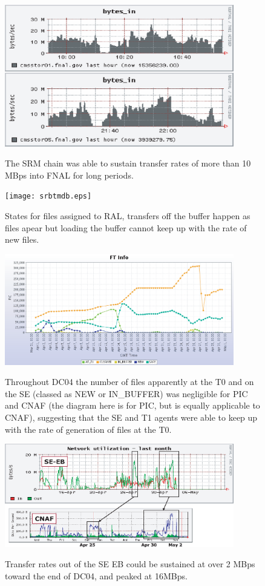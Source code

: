 \documentclass{cmspaper}
\begin{document}
\clearpage
\begin{figure}[tbp]
\centering
\includegraphics[angle=90,width=10cm]{FNAL-network.eps}
\label{fig:FNAL-network}
\caption{The SRM chain was able to sustain transfer rates of more than
10 MBps into FNAL for long periods.}
\end{figure}
\clearpage
\begin{figure}[tbp]
\centering
\texttt{[image: srbtmdb.eps]}
\label{fig:RAL-files}
\caption{States for files assigned to RAL, transfers off the buffer
happen as files apear but loading the buffer cannot keep up with the
rate of new files.}
\end{figure}
\clearpage
\begin{figure}[tbp]
\centering
\includegraphics[angle=90,width=10cm]{PIC-FT.eps}
\label{fig:PIC-FT}
\caption{Throughout DC04 the number of files apparently at the T0 and
 on the SE (classed as NEW or IN\_BUFFER) was negligible for PIC and
 CNAF (the diagram here is for PIC, but is equally applicable to
 CNAF), suggesting that the SE and T1 agents were able to keep up
 with the rate of generation of files at the T0. }
\end{figure}
\clearpage
\begin{figure}[tbp]
\centering
\includegraphics[angle=90,width=10cm]{SE-EB-network.eps}
\label{fig:SE-EB-network}
\caption{Transfer rates out of the SE EB could be sustained at over 2
MBps toward the end of DC04, and peaked at 16MBps.}
\end{figure}
\end{document}
